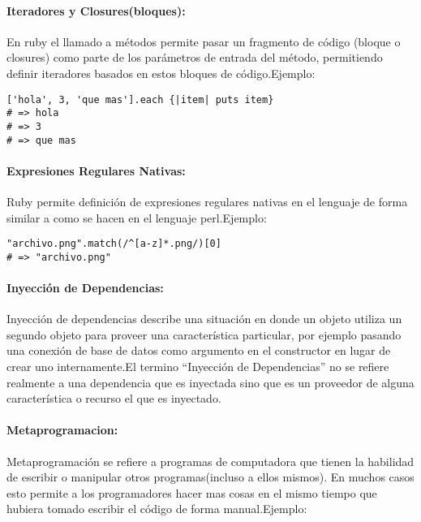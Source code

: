\paragraph{Iteradores y Closures(bloques):}
En ruby el llamado a métodos permite pasar un fragmento de código (bloque o closures) como parte de los parámetros de entrada del método, permitiendo definir iteradores basados en estos bloques de código.\newline Ejemplo:

\begin{verbatim}
['hola', 3, 'que mas'].each {|item| puts item}
# => hola
# => 3
# => que mas
\end{verbatim}


\paragraph{Expresiones Regulares Nativas:}
Ruby permite definición de expresiones regulares nativas en el lenguaje de forma similar a como se hacen en el lenguaje perl.\newline Ejemplo:

\begin{verbatim}
"archivo.png".match(/^[a-z]*.png/)[0]
# => "archivo.png"
\end{verbatim}

\paragraph{Inyección de Dependencias:}
Inyección de dependencias describe una situación en donde un objeto utiliza un segundo objeto para proveer una característica particular, por ejemplo pasando una conexión de base de datos como argumento en el constructor en lugar de crear uno internamente.\newline El termino ``Inyección de Dependencias'' no se refiere realmente a una dependencia que es inyectada sino que es un proveedor de alguna característica o recurso el que es inyectado.

\paragraph{Metaprogramacion:}
Metaprogramación se refiere a programas de computadora que tienen la habilidad de escribir o manipular otros programas(incluso a ellos mismos). En muchos casos esto permite a los programadores hacer mas cosas en el mismo tiempo que hubiera tomado escribir el código de forma manual.\newline Ejemplo:

